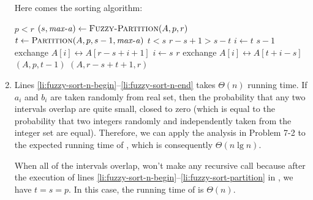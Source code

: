\documentclass[a4paper, fleqn]{article}
\begin{document}
\begin{enumerate}
Here comes the sorting algorithm:
\begin{codebox}
\li \If $p < r$
\li     \Then
            $(s,\id{max-a}) \gets \proc{Fuzzy-Partition}(A,p,r)$
                                                    \label{li:fuzzy-sort-n-begin}
\li         $t \gets \proc{Partition}(A,p,s-1,\id{max-a})$
                                                    \label{li:fuzzy-sort-partition}
\li         \If $t < s$
\li             \Then
                    \If $r - s + 1 > s - t$
\li                     \Then
                            \For $i \gets t$ \To $s - 1$
\li                             \Do exchange $A[i] \leftrightarrow A[r - s + i + 1]$
                                \End
\li                     \Else
                            \For $i \gets s$ \To $r$
\li                             \Do exchange $A[i] \leftrightarrow A[t + i - s]$
                                \End
                        \End
                \End
                                                    \label{li:fuzzy-sort-n-end}
\li         {}$(A,p,t-1)$
\li         {}$(A,r-s+t+1,r)$
        \End
\end{codebox}



\item  %
Lines \ref{li:fuzzy-sort-n-begin}--\ref{li:fuzzy-sort-n-end} takes $\Theta(n)$ 
running time. If $a_i$ and $b_i$ are taken randomly from real set, then the 
probability that any two intervals overlap are quite small, closed to zero 
(which is equal to the probability that two integers randomly and independently 
taken from the integer set are equal). Therefore, we can apply the analysis in 
Problem 7-2 to the expected running time of , which is 
consequently $\Theta(n \lg n)$.

When all of the intervals overlap,  won't make any recursive 
call because after the execution of lines \ref{li:fuzzy-sort-n-begin}--\ref{li:fuzzy-sort-partition} 
in , we have $t = s = p$. In this case, the running time of 
 is $\Theta(n)$.

\end{enumerate}
\end{document}
